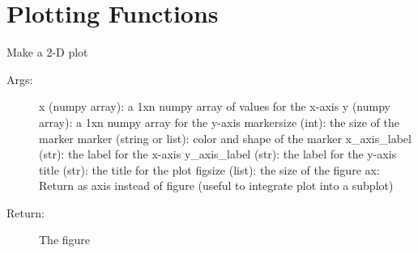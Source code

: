 \documentclass[letterpaper,10pt,english]{sphinxmanual}
\begin{document}
\chapter{Plotting Functions}
\label{\detokenize{Plot:plotting-functions}}\label{\detokenize{Plot::doc}}

\begin{fulllineitems}
\label{\detokenize{Plot:pyleoclim.Plot.plot}}
Make a 2-D plot
\begin{description}
\item[{Args:}] \leavevmode
x (numpy array): a 1xn numpy array of values for the x-axis
y (numpy array): a 1xn numpy array for the y-axis
markersize (int): the size of the marker
marker (string or list): color and shape of the marker
x\_axis\_label (str): the label for the x-axis
y\_axis\_label (str): the label for the y-axis
title (str): the title for the plot
figsize (list): the size of the figure
ax: Return as axis instead of figure (useful to integrate plot into a subplot)

\item[{Return:}] \leavevmode
The figure

\end{description}

\end{fulllineitems}

\end{document}
